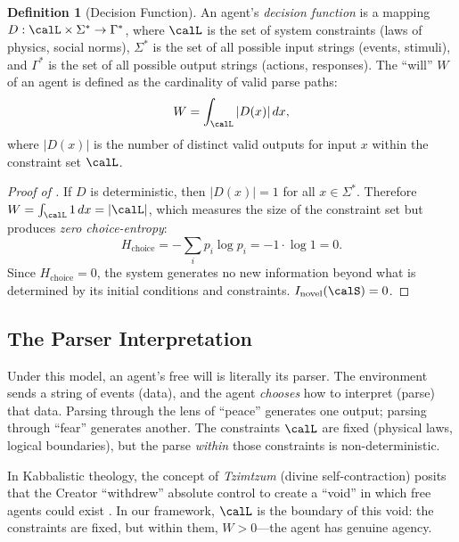 \documentclass[12pt, a4paper]{article}
\theoremstyle{plain}
\theoremstyle{definition}
\newtheorem{definition}[theorem]{Definition}
\begin{document}
\begin{definition}[Decision Function]\label{def:decision}
  An agent's \emph{decision function} is a mapping
  $D: \calL \times \Sigma^* \to \Gamma^*$, where $\calL$ is the set of
  system constraints (laws of physics, social norms), $\Sigma^*$ is the
  set of all possible input strings (events, stimuli), and $\Gamma^*$
  is the set of all possible output strings (actions, responses). The
  ``will'' $W$ of an agent is defined as the cardinality of valid parse
  paths:
  \begin{equation}\label{eq:will}
    W = \int_{\calL} |D(x)|\, dx,
  \end{equation}
  where $|D(x)|$ is the number of distinct valid outputs for input $x$
  within the constraint set $\calL$.
\end{definition}

\begin{proof}[Proof of ]
  If $D$ is deterministic, then $|D(x)| = 1$ for all $x \in \Sigma^*$.
  Therefore $W = \int_{\calL} 1\, dx = |\calL|$, which measures the
  size of the constraint set but produces \emph{zero choice-entropy}:
  \begin{equation}
    H_{\text{choice}} = -\sum_i p_i \log p_i = -1 \cdot \log 1 = 0.
  \end{equation}
  Since $H_{\text{choice}} = 0$, the system generates no new information
  beyond what is determined by its initial conditions and constraints.
  $I_{\text{novel}}(\calS) = 0$. \qedhere
\end{proof}

\subsection{The Parser Interpretation}

Under this model, an agent's free will is literally its parser. The
environment sends a string of events (data), and the agent \emph{chooses}
how to interpret (parse) that data. Parsing through the lens of ``peace''
generates one output; parsing through ``fear'' generates another. The
constraints $\calL$ are fixed (physical laws, logical boundaries), but
the parse \emph{within} those constraints is non-deterministic.

\begin{remark}
  In Kabbalistic theology, the concept of \emph{Tzimtzum} (divine
  self-contraction) posits that the Creator ``withdrew'' absolute control
  to create a ``void'' in which free agents could exist \citep{Scholem1941}.
  In our framework, $\calL$ is the boundary of this void: the constraints
  are fixed, but within them, $W > 0$---the agent has genuine agency.
\end{remark}
\end{document}
